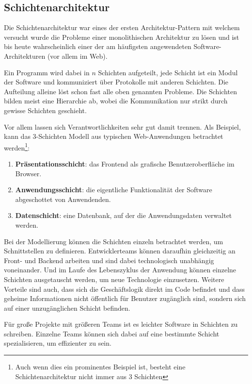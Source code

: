 \subsection{Schichtenarchitektur}
\label{sec:layeredArch}

Die Schichtenarchitektur war eines der ersten Architektur-Pattern mit welchem versucht wurde die Probleme einer monolithischen Architektur zu lösen \cite{SavolainenJuha.2009} und ist bis heute wahrscheinlich einer der am häufigsten angewendeten Software-Architekturen (vor allem im Web).

Ein Programm wird dabei in $n$ Schichten aufgeteilt, jede Schicht ist ein Modul der Software und kommuniziert über Protokolle mit anderen Schichten. Die Aufteilung alleine löst schon fast alle oben genannten Probleme. Die Schichten bilden meist eine Hierarchie ab, wobei die Kommunikation nur strikt durch gewisse Schichten geschieht. 

Vor allem lassen sich Verantwortlichkeiten sehr gut damit trennen. Als Beispiel, kann das 3-Schichten Modell aus typischen Web-Anwendungen betrachtet werden\footnote{Auch wenn dies ein prominentes Beispiel ist, besteht eine Schichtenarchitektur nicht immer aus 3 Schichten}:
\begin{enumerate}
    \item \textbf{Präsentationsschicht}: das Frontend als grafische Benutzeroberfläche im Browser.
    \item \textbf{Anwendungsschicht}: die eigentliche Funktionalität der Software abgeschottet von Anwendenden.
    \item \textbf{Datenschicht}: eine Datenbank, auf der die Anwendungsdaten verwaltet werden.
\end{enumerate}

Bei der Modellierung können die Schichten einzeln betrachtet werden, um Schnittstellen zu definieren. Entwicklerteams können daraufhin gleichzeitig an Front- und Backend arbeiten und sind dabei technologisch unabhängig voneinander. Und im Laufe des Lebenszyklus der Anwendung können einzelne Schichten ausgetauscht werden, um neue Technologie einzusetzen. Weitere Vorteile sind auch, dass sich die Geschäftslogik direkt im Code befindet und dass geheime Informationen nicht öffentlich für Benutzer zugänglich sind, sondern sich auf einer unzugänglichen Schicht befinden.

Für große Projekte mit größeren Teams ist es leichter Software in Schichten zu schreiben. Einzelne Teams können sich dabei auf eine bestimmte Schicht spezialisieren, um effizienter zu sein. 

